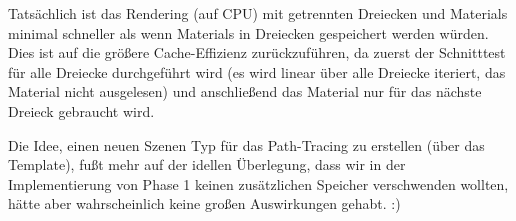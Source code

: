 Tatsächlich ist das Rendering (auf CPU) mit getrennten Dreiecken und Materials minimal schneller als wenn Materials in Dreiecken gespeichert werden würden. Dies ist auf die größere Cache-Effizienz zurückzuführen, da zuerst der Schnitttest für alle Dreiecke durchgeführt wird (es wird linear über alle Dreiecke iteriert, das Material nicht ausgelesen) und anschließend das Material nur für das nächste Dreieck gebraucht wird.

Die Idee, einen neuen Szenen Typ für das Path-Tracing zu erstellen (über das  Template), fußt mehr auf der idellen Überlegung, dass wir in der Implementierung von Phase 1 keinen zusätzlichen Speicher verschwenden wollten, hätte aber wahrscheinlich keine großen Auswirkungen gehabt. :)


